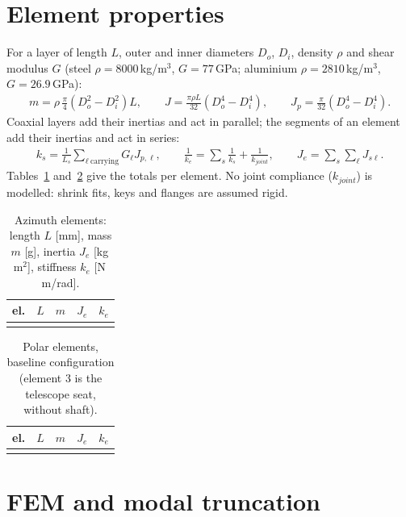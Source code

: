\documentclass[10pt,a4paper]{article}
\numberwithin{equation}{section}
\begin{document}
\section{Element properties}\label{sec:elements}
For a layer of length $L$, outer and inner diameters $D_o$, $D_i$, density $\rho$ and shear modulus $G$ (steel $\rho = 8000$\,kg/m$^3$, $G = 77$\,GPa; aluminium $\rho = 2810$\,kg/m$^3$, $G = 26.9$\,GPa):
\begin{gather}
m = \rho\,\frac{\pi}{4}\left(D_o^2 - D_i^2\right)L, \qquad J = \frac{\pi\rho L}{32}\left(D_o^4 - D_i^4\right), \qquad J_p = \frac{\pi}{32}\left(D_o^4 - D_i^4\right).
\end{gather}
Coaxial layers add their inertias and act in parallel; the segments of an element add their inertias and act in series:
\begin{gather}
k_s = \frac{1}{L_s}\sum_{\ell\ \text{carrying}} G_\ell J_{p,\ell}, \qquad \frac{1}{k_e} = \sum_s \frac{1}{k_s} + \frac{1}{k_{joint}}, \qquad J_e = \sum_s\sum_\ell J_{s\ell}.
\end{gather}
Tables~\ref{tab:el_az} and~\ref{tab:el_pol} give the totals per element. No joint compliance ($k_{joint}$) is modelled: shrink fits, keys and flanges are assumed rigid.
\begin{table}[H]\centering\small
\caption{Azimuth elements: length $L$ [mm], mass $m$ [g], inertia $J_e$ [kg\,m$^2$], stiffness $k_e$ [N\,m/rad].}\label{tab:el_az}
\begin{tabular}{rrrrr}\toprule el. & $L$ & $m$ & $J_e$ & $k_e$ \\ \midrule
\\ \bottomrule\end{tabular}\end{table}
\begin{table}[H]\centering\small
\caption{Polar elements, baseline configuration (element 3 is the telescope seat, without shaft).}\label{tab:el_pol}
\begin{tabular}{rrrrr}\toprule el. & $L$ & $m$ & $J_e$ & $k_e$ \\ \midrule
\\ \bottomrule\end{tabular}\end{table}

\section{FEM and modal truncation}\label{sec:fem}
\end{document}
